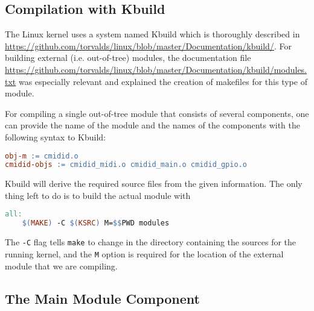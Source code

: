 \documentclass[paper=a4,fontsize=11pt,twocolumn,pagesize,bibtotoc]{scrartcl}
\begin{document}
\subsection{Compilation with Kbuild}
\label{component:compilation}

The Linux kernel uses a system named Kbuild which is thoroughly described in 
\url{https://github.com/torvalds/linux/blob/master/Documentation/kbuild/}.
For building external (i.e. out-of-tree) modules, the documentation file
\url{https://github.com/torvalds/linux/blob/master/Documentation/kbuild/modules.txt}
was especially relevant and explained the creation of makefiles for this type
of module.

For compiling a single out-of-tree module that consists of several components,
one can provide the name of the module and the names of the components with
the following syntax to Kbuild:
\begin{lstlisting}[language=make]
obj-m := cmidid.o
cmidid-objs := cmidid_midi.o cmidid_main.o cmidid_gpio.o
\end{lstlisting}
Kbuild will derive the required source files from the given information.
The only thing left to do is to build the actual module with
\begin{lstlisting}[language=make]
all:
	$(MAKE) -C $(KSRC) M=$$PWD modules
\end{lstlisting}
The \texttt{-C} flag tells \texttt{make} to change in the directory containing the 
sources for the running kernel, and the \texttt{M} option is required for the 
location of the external module that we are compiling.

\subsection{The Main Module Component}
\label{component:main}
\end{document}
